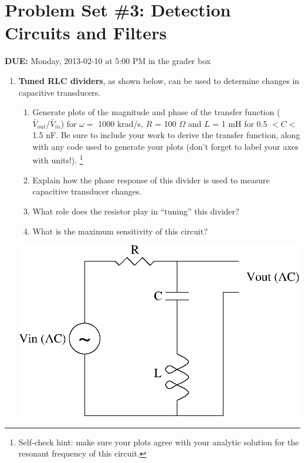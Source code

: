 


\section*{Problem Set \#3: Detection Circuits and Filters}

\textbf{DUE:} Monday, 2013-02-10 at 5:00 PM in the grader box

\begin{enumerate}
\item {\bf Tuned RLC dividers}, as shown below, can be used to determine changes in capacitive
transducers.  
\begin{enumerate}
\item Generate plots of the magnitude and phase of the transfer function
($\bar{V}_{out}/\bar{V}_{in}$) for $\omega =$ 1000 krad/s, $R$ = 100 $\Omega$
and $L$ = 1 mH for 0.5 $< C <$ 1.5 nF.  Be sure to include your work to derive
the transfer function, along with any code used to generate your plots (don't
forget to label your axes with units!).  \footnote{Self-check hint: make sure
your plots agree with your analytic solution for the resonant frequency of this
circuit.} 

\item Explain how the phase response of this divider is used to measure capacitive transducer changes. 

\item What role does the resistor play in ``tuning'' this divider? 

\item What is the maximum sensitivity of this circuit?

\end{enumerate}

\begin{center}
\includegraphics[scale=0.75]{tunedrlc.eps}
\end{center}


\end{enumerate}
